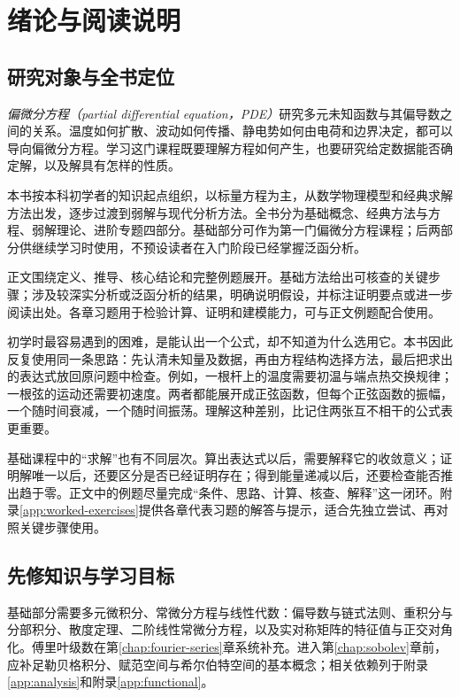 \chapter{绪论与阅读说明}
\label{chap:roadmap}

\section{研究对象与全书定位}

\emph{偏微分方程（partial differential equation，PDE）}研究多元未知函数与其偏导数之间的关系。温度如何扩散、波动如何传播、静电势如何由电荷和边界决定，都可以导向偏微分方程。学习这门课程既要理解方程如何产生，也要研究给定数据能否确定解，以及解具有怎样的性质。

本书按本科初学者的知识起点组织，以标量方程为主，从数学物理模型和经典求解方法出发，逐步过渡到弱解与现代分析方法。全书分为基础概念、经典方法与方程、弱解理论、进阶专题四部分。基础部分可作为第一门偏微分方程课程；后两部分供继续学习时使用，不预设读者在入门阶段已经掌握泛函分析。

正文围绕定义、推导、核心结论和完整例题展开。基础方法给出可核查的关键步骤；涉及较深实分析或泛函分析的结果，明确说明假设，并标注证明要点或进一步阅读出处。各章习题用于检验计算、证明和建模能力，可与正文例题配合使用。

初学时最容易遇到的困难，是能认出一个公式，却不知道为什么选用它。本书因此反复使用同一条思路：先认清未知量及数据，再由方程结构选择方法，最后把求出的表达式放回原问题中检查。例如，一根杆上的温度需要初温与端点热交换规律；一根弦的运动还需要初速度。两者都能展开成正弦函数，但每个正弦函数的振幅，一个随时间衰减，一个随时间振荡。理解这种差别，比记住两张互不相干的公式表更重要。

基础课程中的“求解”也有不同层次。算出表达式以后，需要解释它的收敛意义；证明解唯一以后，还要区分是否已经证明存在；得到能量递减以后，还要检查能否推出趋于零。正文中的例题尽量完成“条件、思路、计算、核查、解释”这一闭环。附录\ref{app:worked-exercises}提供各章代表习题的解答与提示，适合先独立尝试、再对照关键步骤使用。

\section{先修知识与学习目标}

基础部分需要多元微积分、常微分方程与线性代数：偏导数与链式法则、重积分与分部积分、散度定理、二阶线性常微分方程，以及实对称矩阵的特征值与正交对角化。傅里叶级数在第\ref{chap:fourier-series}章系统补充。进入第\ref{chap:sobolev}章前，应补足勒贝格积分、赋范空间与希尔伯特空间的基本概念；相关依赖列于附录\ref{app:analysis}和附录\ref{app:functional}。

